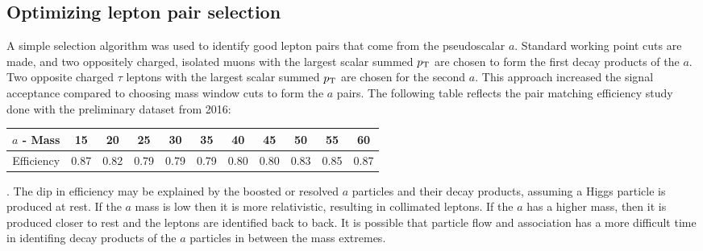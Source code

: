 \subsection{Optimizing lepton pair selection}
\label{sec:selection}
A simple selection algorithm was used to identify good lepton pairs that come from the pseudoscalar $a$. 
Standard working point cuts are made, and two oppositely charged, isolated muons with the largest scalar summed $p_{\mathrm{T}}$ are chosen to form the first decay products of the $a$. 
Two opposite charged $\tau$ leptons with the largest scalar summed $p_{\mathrm{T}}$ are chosen for the second $a$. 
This approach increased the signal acceptance compared to choosing mass window cuts to form the $a$ pairs. 
The following table reflects the pair matching efficiency study done with the preliminary dataset from 2016:
\begin{table}[h]
\begin{center}
    \label{tab:paireff}
\begin{tabular}{|c|c|c|c|c|c|c|c|c|c|c|}\hline
$a$ - Mass & 15     & 20    & 25    & 30    & 35    & 40    & 45    & 50    & 55    & 60 \\\hline
Efficiency & 0.87   & 0.82  &0.79   & 0.79  & 0.79  & 0.80  & 0.80  & 0.83  & 0.85  & 0.87 \\\hline 
\end{tabular}
\end{center}
\end{table}.
The dip in efficiency may be explained by the boosted or resolved $a$ particles and their decay products, assuming a Higgs particle is produced at rest. If the $a$ mass is low then it is more relativistic, resulting in collimated leptons. If the $a$ has a higher mass, then it is produced closer to rest and the leptons are identified back to back. It is possible that particle flow and association has a more difficult time in identifing decay products of the $a$ particles in between the mass extremes.

